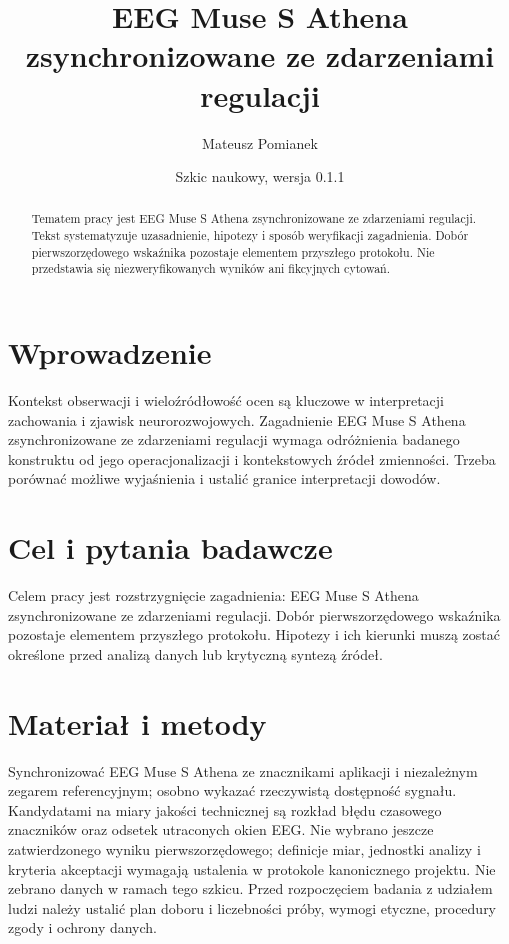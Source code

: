 \documentclass[11pt,a4paper]{article}
\title{EEG Muse S Athena zsynchronizowane ze zdarzeniami regulacji}
\author{Mateusz Pomianek}
\date{Szkic naukowy, wersja 0.1.1}
\begin{document}
\maketitle

\begin{abstract}

Tematem pracy jest EEG Muse S Athena zsynchronizowane ze zdarzeniami regulacji. Tekst systematyzuje uzasadnienie, hipotezy i sposób weryfikacji zagadnienia. Dobór pierwszorzędowego wskaźnika pozostaje elementem przyszłego protokołu. Nie przedstawia się niezweryfikowanych wyników ani fikcyjnych cytowań.

\end{abstract}

\section{Wprowadzenie}

Kontekst obserwacji i wieloźródłowość ocen są kluczowe w interpretacji zachowania i zjawisk neurorozwojowych. Zagadnienie EEG Muse S Athena zsynchronizowane ze zdarzeniami regulacji wymaga odróżnienia badanego konstruktu od jego operacjonalizacji i kontekstowych źródeł zmienności. Trzeba porównać możliwe wyjaśnienia i ustalić granice interpretacji dowodów.

\section{Cel i pytania badawcze}

Celem pracy jest rozstrzygnięcie zagadnienia: EEG Muse S Athena zsynchronizowane ze zdarzeniami regulacji. Dobór pierwszorzędowego wskaźnika pozostaje elementem przyszłego protokołu. Hipotezy i ich kierunki muszą zostać określone przed analizą danych lub krytyczną syntezą źródeł.

\section{Materiał i metody}

Synchronizować EEG Muse S Athena ze znacznikami aplikacji i niezależnym zegarem referencyjnym; osobno wykazać rzeczywistą dostępność sygnału. Kandydatami na miary jakości technicznej są rozkład błędu czasowego znaczników oraz odsetek utraconych okien EEG. Nie wybrano jeszcze zatwierdzonego wyniku pierwszorzędowego; definicje miar, jednostki analizy i kryteria akceptacji wymagają ustalenia w protokole kanonicznego projektu. Nie zebrano danych w ramach tego szkicu. Przed rozpoczęciem badania z udziałem ludzi należy ustalić plan doboru i liczebności próby, wymogi etyczne, procedury zgody i ochrony danych.
\end{document}
